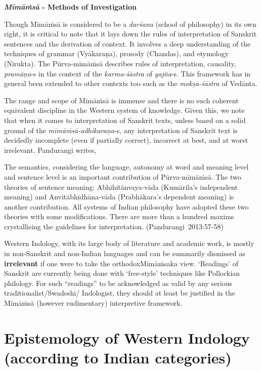 \medskip
{\bf {\sl\bfseries Mīmāṁsā} - Methods of Investigation}

Though Mīmāṁsā is considered to be a {\sl darśana} (school of philosophy) in its own right, it is critical to note that it lays down the rules of interpretation of Sanskrit sentences and the derivation of context. It involves a deep understanding of the techniques of grammar (Vyākaraṇa), prosody (Chandas), and etymology (Nirukta). The Pūrva-mīmāṁsā describes rules of interpretation, causality, {\sl pramāṇa}-s in the context of the {\sl karma-śāstra} of {\sl yajña}-s. This framework has in general been extended to other contexts too such as the {\sl mokṣa-śāstra} of Vedānta.

The range and scope of Mīmāṁsā is immense and there is no such coherent equivalent discipline in the Western system of knowledge. Given this, we note that when it comes to interpretation of Sanskrit texts, unless based on a solid ground of the \hbox{{\sl mīmāṁsā-adhikaraṇa}-s,} any interpretation of Sanskrit text is decidedly incomplete (even if partially correct), incorrect at best, and at worst irrelevant. Pandurangi writes,
\begin{myquote}
The semantics, considering the language, autonomy at word and meaning level and sentence level is an important contribution of Pūrva-mīmāṁ\-sā. The two theories of sentence meaning: Abhihitānvaya-vāda (Kumārila's independent meaning) and Anvitābhidhāna-vāda (Prabhākara's dependent meaning) is another contribution. All systems of Indian philosophy have adopted these two theories with some modifications. There are more than a hundred maxims crystallising the guidelines for interpretation. \hfill \hbox{(Pandurangi 2013:57-58)}
\end{myquote}

Western Indology, with its large body of literature and academic work, is mostly in non-Sanskrit and non-Indian languages and can be summarily dismissed as {\bf irrelevant} if one were to take the orthodox\break Mīmāṁsaka view. `Readings' of Sanskrit are currently being done with `free-style' techniques like Pollockian philology. For such ``readings'' to be acknowledged as valid by any serious traditionalist/Swadeshi/ Indologist, they should at least be justified in the Mīmāṁsā (however rudimentary) interpretive framework. 

\newpage

\section*{Epistemology of Western Indology (according to Indian categories)}

